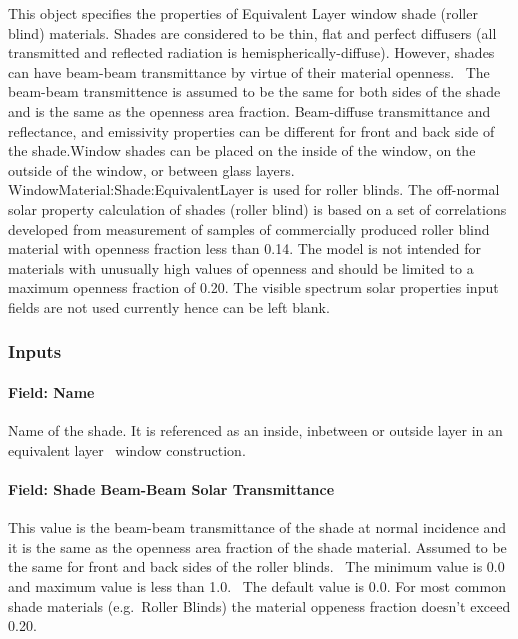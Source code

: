 This object specifies the properties of Equivalent Layer window shade (roller blind) materials. Shades are considered to be thin, flat and perfect diffusers (all transmitted and reflected radiation is hemispherically-diffuse). However, shades can have beam-beam transmittance by virtue of their material openness.~ The beam-beam transmittence is assumed to be the same for both sides of the shade and is the same as the openness area fraction. Beam-diffuse transmittance and reflectance, and emissivity properties can be different for front and back side of the shade.Window shades can be placed on the inside of the window, on the outside of the window, or between glass layers. WindowMaterial:Shade:EquivalentLayer is used for roller blinds. The off-normal solar property calculation of shades (roller blind) is based on a set of correlations developed from measurement of samples of commercially produced roller blind material with openness fraction less than 0.14. The model is not intended for materials with unusually high values of openness and should be limited to a maximum openness fraction of 0.20. The visible spectrum solar properties input fields are not used currently hence can be left blank.

\subsubsection{Inputs}\label{inputs-26-002}

\paragraph{Field: Name}\label{field-name-20-003}

Name of the shade. It is referenced as an inside, inbetween or outside layer in an equivalent layer~ window construction.

\paragraph{Field: Shade Beam-Beam Solar Transmittance}\label{field-shade-beam-beam-solar-transmittance}

This value is the beam-beam transmittance of the shade at normal incidence and it is the same as the openness area fraction of the shade material. Assumed to be the same for front and back sides of the roller blinds.~ The minimum value is 0.0 and maximum value is less than 1.0.~ The default value is 0.0. For most common shade materials (e.g.~Roller Blinds) the material oppeness fraction doesn't exceed 0.20.

